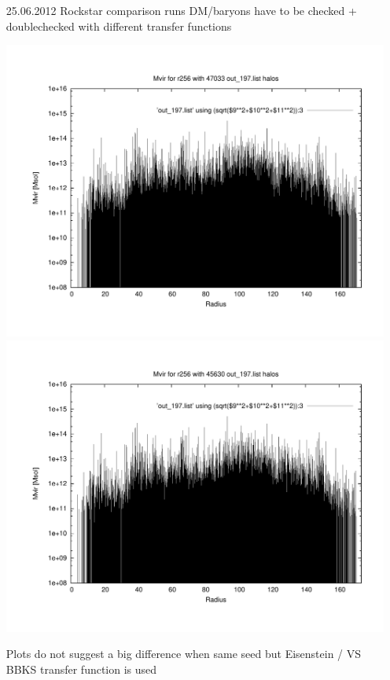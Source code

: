 \documentclass[a4paper,11pt,fleqn,oneside]{book}
\begin{document}
\begin{itemize}
\begin{table}
\begin{tabular}{l|c|c}
 \end{tabular}
\end{table}

\item[25.06.2012]
Rockstar comparison runs DM/baryons have to be checked + doublechecked with 
different transfer functions 

\includegraphics[scale=0.25]{r256/h70/mu_100h70_8-514200/plot_mvir_out_197.pdf}
\includegraphics[scale=0.25]{r256/h70/mu_100h70_8-514200_bbks/plot_mvir_out_197.pdf}

Plots do not suggest a big difference when same seed but Eisenstein / VS BBKS transfer 
function is used


\end{itemize}
\end{document}
